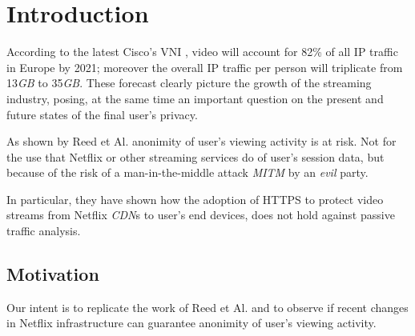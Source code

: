 \chapter{Introduction}\label{sec:introduction}

According to the latest Cisco's VNI \cite{video-traffic-forecast}, video will
account for 82\% of all IP traffic in Europe by 2021; moreover the overall IP
traffic per person will triplicate from 13\emph{GB} to 35\emph{GB}. These
forecast clearly picture the growth of the streaming industry, posing, at the
same time an important question on the present and future states of the final
user's privacy.

As shown by Reed et Al. \cite{netflix-real-time} anonimity of user's viewing
activity is at risk. Not for the use that Netflix or other streaming services
do of user's session data, but because of the risk of a man-in-the-middle
attack \emph{MITM} by an \textit{evil} party. 

In particular, they have shown how the adoption of HTTPS to protect video
streams from Netflix \emph{CDN}s to user's end devices, does not hold against
passive traffic analysis.

\section{Motivation}\label{sec:motivation}

Our intent is to replicate the work of Reed et Al. and to observe if recent
changes in Netflix infrastructure can guarantee anonimity of user's viewing
activity.

